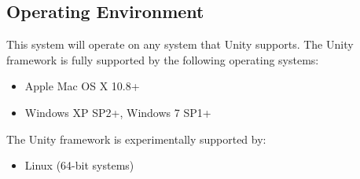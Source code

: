 \subsection{Operating Environment}
This system will operate on any system that Unity supports. The Unity framework is fully supported by the following operating systems:
\begin{itemize}
    \item Apple Mac OS X  10.8+
    \item Windows XP SP2+, Windows 7 SP1+
\end{itemize}
The Unity framework is experimentally supported by:
\begin{itemize}
    \item Linux (64-bit systems)
\end{itemize}
